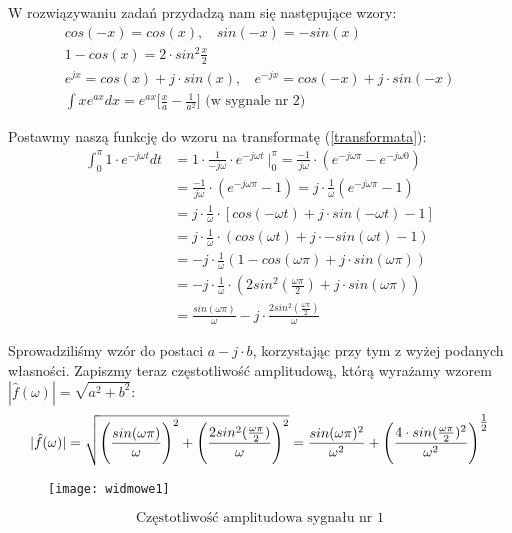 \documentclass[11pt,a4paper]{article}
\numberwithin{liczba1}{liczba2}
\begin{document}
W rozwiązywaniu zadań przydadzą nam się następujące wzory:
\begin{gather*}
cos(-x) = cos(x), \ \ \ \ sin(-x) = -sin(x) \\
1 - cos(x) = 2 \cdot sin^2{\frac{x}{2}} \\
e^{jx} = cos(x) + j \cdot sin(x), \ \ \ \ e^{-jx} = cos(-x) + j \cdot sin(-x) \\
\int x e^{ax} dx = e^{ax}\Big[\frac{x}{a} - \frac{1}{a^2} \Big] \text{\ \ \ \ (w sygnale nr 2)}
\end{gather*}

Postawmy naszą funkcję do wzoru na transformatę (\ref{transformata}): \\
\begin{equation}
\begin{split}
\int_{0}^{\pi} 1 \cdot e^{-j \omega t} dt
&{} = 1 \cdot \frac{1}{-j \omega } \cdot e^{-j \omega t} \ \Bigg|^\pi_0 = \frac{-1}{j \omega} \cdot (e^{-j \omega \pi} - e^{-j \omega 0}) \\
&{} = \frac{-1}{j \omega} \cdot (e^{-j \omega \pi} - 1) = j \cdot \frac{1}{\omega}(e^{-j \omega \pi} - 1) \\
&{} = j \cdot \frac{1}{\omega} \cdot [cos(-\omega t) + j \cdot sin(-\omega t) - 1]\\
&{} = j \cdot \frac{1}{\omega} \cdot (cos(\omega t) + j \cdot -sin(\omega t) - 1)\\
&{} = -j \cdot \frac{1}{\omega}(1 - cos(\omega \pi) + j \cdot sin(\omega \pi)) \\
&{} = -j \cdot \frac{1}{\omega} \cdot (2sin^2(\frac{\omega \pi}{2}) + j \cdot sin(\omega \pi)) \\
&{} = \frac{sin(\omega \pi)}{\omega} - j \cdot \frac{2sin^2(\frac{\omega \pi}{2})}{\omega}
\end{split}
\end{equation}
\pagebreak

Sprowadziliśmy wzór do postaci $ a - j \cdot b $, korzystając przy tym z wyżej podanych własności. Zapiszmy teraz częstotliwość amplitudową, którą wyrażamy wzorem $ |\hat{f} (\omega)| = \sqrt{a^2 + b^2} $:
\begin{equation}
|\hat{f} (\omega)| = \sqrt{ \Bigg(\frac{sin(\omega \pi)}{\omega}\Bigg)^2 + \Bigg(\frac{2sin^2(\frac{\omega \pi}{2})}{\omega}\Bigg)^2 } = \frac{sin(\omega \pi)^2}{\omega^2} + \Bigg(\frac{4 \cdot sin(\frac{\omega \pi}{2})^2}{\omega^2}\Bigg)^\mathlarger{\frac{1}{2}}
\end{equation}
\begin{figure}[h]
\centering
\texttt{[image: widmowe1]}
\end{figure}
\[
\text{Częstotliwość amplitudowa sygnału nr 1}
\] \\
\end{document}
